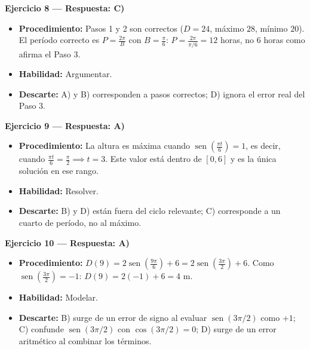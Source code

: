\documentclass[12pt,letterpaper]{article}
\providecommand{\sen}{\operatorname{sen}}
\begin{document}
\textbf{Ejercicio 8 --- Respuesta: C)}
\begin{itemize}[leftmargin=*]
    \item \textbf{Procedimiento:} Pasos 1 y 2 son correctos ($D=24$, máximo $28$, mínimo $20$). El período correcto es $P=\frac{2\pi}{B}$ con $B=\frac{\pi}{6}$: $P=\frac{2\pi}{\pi/6}=12$ horas, no $6$ horas como afirma el Paso 3.
    \item \textbf{Habilidad:} Argumentar.
    \item \textbf{Descarte:} A) y B) corresponden a pasos correctos; D) ignora el error real del Paso 3.
\end{itemize}

\vspace{1.2cm}

\textbf{Ejercicio 9 --- Respuesta: A)}
\begin{itemize}[leftmargin=*]
    \item \textbf{Procedimiento:} La altura es máxima cuando $\sen\left(\frac{\pi t}{6}\right)=1$, es decir, cuando $\frac{\pi t}{6}=\frac{\pi}{2} \implies t=3$. Este valor está dentro de $[0,6]$ y es la única solución en ese rango.
    \item \textbf{Habilidad:} Resolver.
    \item \textbf{Descarte:} B) y D) están fuera del ciclo relevante; C) corresponde a un cuarto de período, no al máximo.
\end{itemize}

\vspace{1.2cm}

\textbf{Ejercicio 10 --- Respuesta: A)}
\begin{itemize}[leftmargin=*]
    \item \textbf{Procedimiento:} $D(9)=2\sen\left(\frac{9\pi}{6}\right)+6=2\sen\left(\frac{3\pi}{2}\right)+6$. Como $\sen\left(\frac{3\pi}{2}\right)=-1$: $D(9)=2(-1)+6=4\text{ m}$.
    \item \textbf{Habilidad:} Modelar.
    \item \textbf{Descarte:} B) surge de un error de signo al evaluar $\sen(3\pi/2)$ como $+1$; C) confunde $\sen(3\pi/2)$ con $\cos(3\pi/2)=0$; D) surge de un error aritmético al combinar los términos.
\end{itemize}
\end{document}

